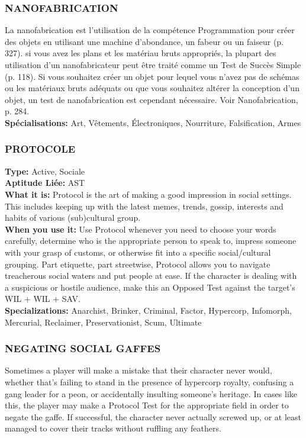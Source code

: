 \subsubsection{NANOFABRICATION} La nanofabrication est l'utilisation de la compétence Programmation pour créer des objets en utilisant une machine d'abondance, un fabeur ou un faiseur (p. 327). si vous avez les plans et les matériau bruts appropriés, la plupart des utilisation d'un nanofabricateur peut être traité comme un Test de Succès Simple (p. 118). Si vous souhaitez créer un objet pour lequel vous n'avez pas de schémas ou les matériaux bruts adéquats ou que vous souhaitez altérer la conception d'un objet, un test de nanofabrication est cependant nécessaire. Voir Nanofabrication, p. 284. \\ \textbf{Spécialisations:} Art, Vêtements, Électroniques, Nourriture, Falsification, Armes 

\subsubsection{PROTOCOLE} \textbf{Type:} Active, Sociale \\ \textbf{Aptitude Liée:} AST \\ \textbf{What it is:} Protocol is the art of making a good impression in social settings. This includes keeping up with the latest memes, trends, gossip, interests and habits of various (sub)cultural group. \\ \textbf{When you use it:} Use Protocol whenever you need to choose your words carefully, determine who is the appropriate person to speak to, impress someone with your grasp of customs, or otherwise fit into a specific social/cultural grouping. Part etiquette, part streetwise, Protocol allows you to navigate treacherous social waters and put people at ease. If the character is dealing with a suspicious or hostile audience, make this an Opposed Test against the target’s WIL + WIL + SAV. \\ \textbf{Specializations:} Anarchist, Brinker, Criminal, Factor, Hypercorp, Infomorph, Mercurial, Reclaimer, Preservationist, Scum, Ultimate 

\subsubsection{NEGATING SOCIAL GAFFES} Sometimes a player will make a mistake that their character never would, whether that’s failing to stand in the presence of hypercorp royalty, confusing a gang leader for a peon, or accidentally insulting someone’s heritage. In cases like this, the player may make a Protocol Test for the appropriate field in order to negate the gaffe. If successful, the character never actually screwed up, or at least managed to cover their tracks without ruffling any feathers. 



